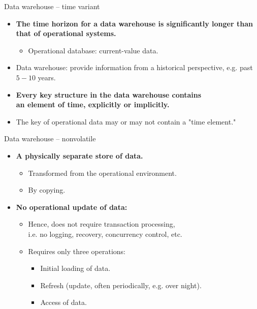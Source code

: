 \documentclass[aspectratio=169,t]{beamer}
\begin{document}
  { 
    \begin{frame}{Data warehouse -- time variant}
        \begin{itemize}
            \item \textbf{The {\color{airforceblue}time horizon} for a data warehouse is {\color{airforceblue}significantly longer} than that of operational systems.}
            \begin{itemize}
              \item Operational database: current-value data.
            \end{itemize}
            \item Data warehouse: provide information from a historical perspective, e.g. past $5-10$ years.
            \item \textbf{Every key structure in the data warehouse contains \\
            an element of time, explicitly or implicitly.}
            \item The key of operational data may or may not contain a "time element."
        \end{itemize}
    \end{frame}
  }

  { 
    \begin{frame}{Data warehouse -- nonvolatile}
        \begin{itemize}
            \item \textbf{A {\color{airforceblue}physically separate} store of data.}
            \begin{itemize}
              \item Transformed from the operational environment.
              \item By {\color{airforceblue}copying}.
            \end{itemize}
            \item \textbf{No operational update of data:}
            \begin{itemize}
              \item Hence, does not require transaction processing, \\
              i.e. no logging, recovery, concurrency control, etc.
              \item Requires only three operations:
              \begin{itemize}
                \item Initial loading of data.
                \item Refresh (update, often periodically, e.g. over night).
                \item Access of data.
              \end{itemize}
            \end{itemize}
        \end{itemize}
    \end{frame}
  }
\end{document}
